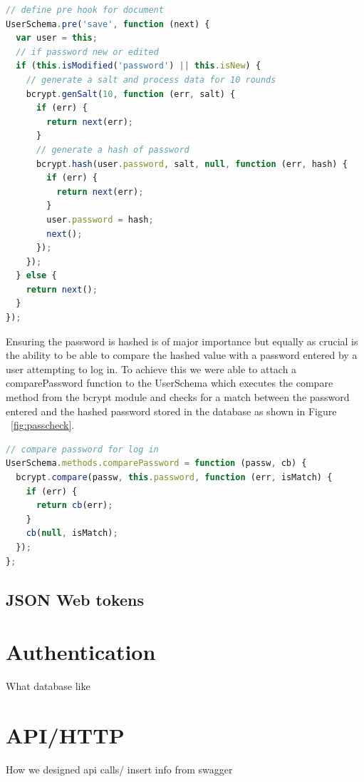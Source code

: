 \begin{lstlisting}[language=JavaScript,caption={Password Hashing},captionpos=b,label={fig:presave}]
// define pre hook for document
UserSchema.pre('save', function (next) {
  var user = this;
  // if password new or edited
  if (this.isModified('password') || this.isNew) {
    // generate a salt and process data for 10 rounds
    bcrypt.genSalt(10, function (err, salt) {
      if (err) {
        return next(err);
      }
      // generate a hash of password
      bcrypt.hash(user.password, salt, null, function (err, hash) {
        if (err) {
          return next(err);
        }
        user.password = hash;
        next();
      });
    });
  } else {
    return next();
  }
});

\end{lstlisting}
Ensuring the password is hashed is of major importance but equally as crucial is the ability to be able to compare the hashed value with a password entered by a user attempting to log in. To achieve this we were able to attach a comparePassword function to the UserSchema which executes the compare method from the bcrypt module and checks for a match between the password entered and the hashed password stored in the database as shown in Figure ~\ref{fig:passcheck}. 
\begin{lstlisting}[language=JavaScript,caption={Password Comparision},captionpos=b,label={fig:passcheck}]
// compare password for log in
UserSchema.methods.comparePassword = function (passw, cb) {
  bcrypt.compare(passw, this.password, function (err, isMatch) {
    if (err) {
      return cb(err);
    }
    cb(null, isMatch);
  });
};
\end{lstlisting}

\subsection{JSON Web tokens}
\section{Authentication}
What database like

\section{API/HTTP}
How we designed api calls/
insert info from swagger

